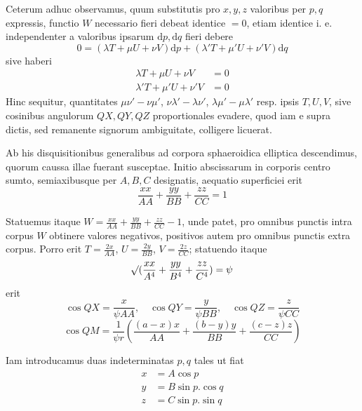 \par
Ceterum adhuc observamus, quum substitutis pro $x,y,z$ valoribus per $p,q$ expressis, functio $W$ necessario fieri debeat identice $=0$, etiam identice i. e. independenter a valoribus ipsarum $\mathrm{d}p,\mathrm{d}q$ fieri debere
\[
0=(\lambda T+\mu U+\nu V)\mathrm{d}p+(\lambda'T+\mu'U+\nu'V)\mathrm{d}q
\]
sive haberi
\[
\begin{aligned}
\lambda T+\mu U+\nu V&=0\\
\lambda'T+\mu'U+\nu'V&=0
\end{aligned}
\]
Hinc sequitur, quantitates $\mu\nu'-\nu\mu'$, $\nu\lambda'-\lambda\nu'$, $\lambda\mu'-\mu\lambda'$ resp. ipsis $T,U,V$, sive cosinibus angulorum $QX,QY,QZ$ proportionales evadere, quod iam e supra dictis, sed remanente signorum ambiguitate, colligere licuerat.

\par
Ab his disquisitionibus generalibus ad corpora sphaeroidica elliptica descendimus, quorum caussa illae fuerant susceptae. Initio abscissarum in corporis centro sumto, semiaxibusque per $A,B,C$ designatis, aequatio superficiei erit
\[
\frac{xx}{AA}+\frac{yy}{BB}+\frac{zz}{CC}=1
\]
\par
Statuemus itaque $W=\frac{xx}{AA}+\frac{yy}{BB}+\frac{zz}{CC}-1$, unde patet, pro omnibus punctis intra corpus $W$ obtinere valores negativos, positivos autem pro omnibus punctis extra corpus. Porro erit $T=\frac{2x}{AA}$, $U=\frac{2y}{BB}$, $V=\frac{2z}{CC}$; statuendo itaque
\[
\mathord{{}^{}\!\surd}(\frac{xx}{A^4}+\frac{yy}{B^4}+\frac{zz}{C^4})=\psi
\]
erit
\[
\cos QX=\frac{x}{\psi AA},\quad\cos QY=\frac{y}{\psi BB},\quad\cos QZ=\frac{z}{\psi CC}
\]
\[
\cos QM=\frac{1}{\psi r}(\frac{(a-x)x}{AA}+\frac{(b-y)y}{BB}+\frac{(c-z)z}{CC})
\]

\par
Iam introducamus duas indeterminatas $p,q$ tales ut fiat
\[
\begin{aligned}
x&=A\cos p\\
y&=B\sin p.\cos q\\
z&=C\sin p.\sin q
\end{aligned}
\]

